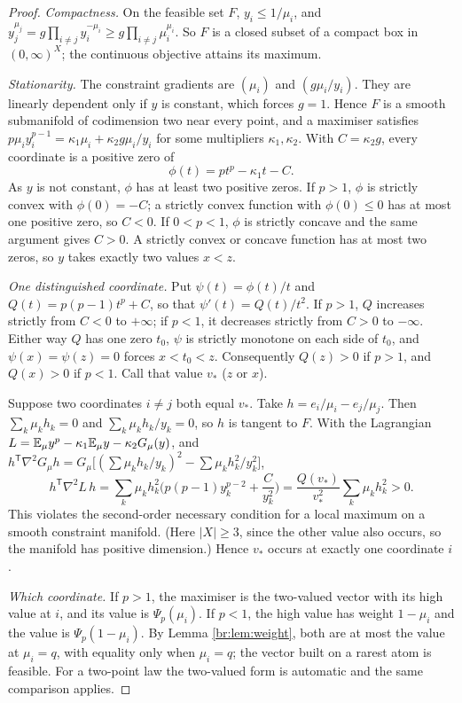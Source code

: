 \begin{proof}
\emph{Compactness.} On the feasible set \(F\), \(y_i\le1/\mu_i\), and
\(y_j^{\mu_j}=g\prod_{i\ne j}y_i^{-\mu_i}\ge g\prod_{i\ne j}\mu_i^{\mu_i}\).
So \(F\) is a closed subset of a compact box in \((0,\infty)^X\); the
continuous objective attains its maximum.

\emph{Stationarity.} The constraint gradients are \((\mu_i)\) and
\((g\mu_i/y_i)\). They are linearly dependent only if \(y\) is constant,
which forces \(g=1\). Hence \(F\) is a smooth submanifold of codimension two
near every point, and a maximiser satisfies
\(p\mu_iy_i^{p-1}=\kappa_1\mu_i+\kappa_2 g\mu_i/y_i\) for some multipliers
\(\kappa_1,\kappa_2\). With \(C=\kappa_2 g\), every coordinate is a positive zero of
\[
\phi(t)=pt^p-\kappa_1 t-C .
\]
As \(y\) is not constant, \(\phi\) has at least two positive zeros. If
\(p>1\), \(\phi\) is strictly convex with \(\phi(0)=-C\); a strictly convex
function with \(\phi(0)\le0\) has at most one positive zero, so \(C<0\). If
\(0<p<1\), \(\phi\) is strictly concave and the same argument gives \(C>0\).
A strictly convex or concave function has at most two zeros, so \(y\) takes
exactly two values \(x<z\).

\emph{One distinguished coordinate.} Put \(\psi(t)=\phi(t)/t\) and
\(Q(t)=p(p-1)t^p+C\), so that \(\psi'(t)=Q(t)/t^2\). If \(p>1\), \(Q\)
increases strictly from \(C<0\) to \(+\infty\); if \(p<1\), it decreases
strictly from \(C>0\) to \(-\infty\). Either way \(Q\) has one zero \(t_0\),
\(\psi\) is strictly monotone on each side of \(t_0\), and
\(\psi(x)=\psi(z)=0\) forces \(x<t_0<z\). Consequently \(Q(z)>0\) if \(p>1\),
and \(Q(x)>0\) if \(p<1\). Call that value \(v_*\) (\(z\) or \(x\)).

Suppose two coordinates \(i\ne j\) both equal \(v_*\). Take
\(h=e_i/\mu_i-e_j/\mu_j\). Then \(\sum_k\mu_kh_k=0\) and
\(\sum_k\mu_kh_k/y_k=0\), so \(h\) is tangent to \(F\). With the Lagrangian
\(L=\mathbb E_\mu y^p-\kappa_1\mathbb E_\mu y-\kappa_2 G_\mu(y)\), and
\(h^{\mathsf T}\nabla^2G_\mu h=G_\mu\big[(\sum\mu_kh_k/y_k)^2-\sum\mu_kh_k^2/y_k^2\big]\),
\[
h^{\mathsf T}\nabla^2L\,h
=\sum_k\mu_kh_k^2\Big(p(p-1)y_k^{p-2}+\frac C{y_k^2}\Big)
=\frac{Q(v_*)}{v_*^2}\sum_k\mu_kh_k^2>0 .
\]
This violates the second-order necessary condition for a local maximum on a
smooth constraint manifold. (Here \(|X|\ge3\), since the other value also
occurs, so the manifold has positive dimension.) Hence \(v_*\) occurs at
exactly one coordinate \(i\).

\emph{Which coordinate.} If \(p>1\), the maximiser is the two-valued vector
with its high value at \(i\), and its value is \(\Psi_p(\mu_i)\). If \(p<1\),
the high value has weight \(1-\mu_i\) and the value is \(\Psi_p(1-\mu_i)\). By
Lemma \ref{br:lem:weight}, both are at most the value at \(\mu_i=q\), with
equality only when \(\mu_i=q\); the vector built on a rarest atom is
feasible. For a two-point law the two-valued form is automatic and the same
comparison applies.
\end{proof}

